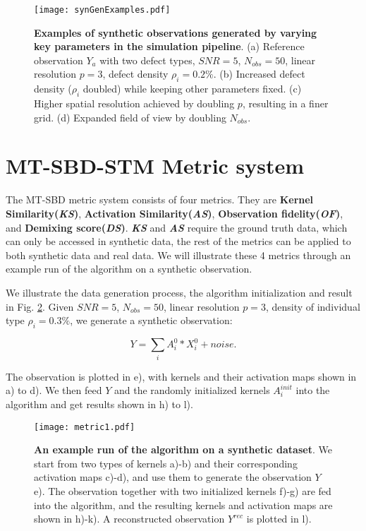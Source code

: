 \begin{figure}
	\texttt{[image: synGenExamples.pdf]} 
	\centering
	\caption[\textbf{Examples of synthetic observations generated by varying key parameters in the simulation pipeline}]{\textbf{Examples of synthetic observations generated by varying key parameters in the simulation pipeline}. (a) Reference observation $Y_a$ with two defect types, $SNR = 5$, $N_{obs}=50$, linear resolution $p=3$, defect density $\rho_i=0.2\%$. (b) Increased defect density ($\rho_i$ doubled) while keeping other parameters fixed. (c) Higher spatial resolution achieved by doubling $p$, resulting in a finer grid. (d) Expanded field of view by doubling $N_{obs}$.}
	\label{fig:synexample}
\end{figure}

\section{MT-SBD-STM Metric system}
The MT-SBD metric system consists of four metrics. They are \textbf{Kernel Similarity(\textit{KS})}, \textbf{Activation Similarity(\textit{AS})}, \textbf{Observation fidelity(\textit{OF})}, and \textbf{Demixing score(\textit{DS})}. \textbf{\textit{KS}} and \textbf{\textit{AS}} require the ground truth data, which can only be accessed in synthetic data, the rest of the metrics can be applied to both synthetic data and real data. We will illustrate these 4 metrics through an example run of the algorithm on a synthetic observation. 

We illustrate the data generation process, the algorithm initialization and result in Fig. \ref{fig:metric}. Given $SNR = 5$, $N_{obs}=50$, linear resolution $p = 3$, density of individual type $\rho_i = 0.3\%$, we generate a synthetic observation: 

\begin{equation}
	\label{eq:observation}
	Y = \sum_i A^0_i * X^0_i + noise.
\end{equation} 

The observation is plotted in e), with kernels and their activation maps shown in a) to d). We then feed $Y$ and the randomly initialized kernels $A_i^{init}$ into the algorithm and get results shown in h) to l). 

\begin{figure}
	\texttt{[image: metric1.pdf]} 
	\centering
	\caption[\textbf{An example run of the algorithm on a synthetic dataset}]{\textbf{An example run of the algorithm on a synthetic dataset}. We start from two types of kernels a)-b) and their corresponding activation maps c)-d), and use them to generate the observation $Y$ e). The observation together with two initialized kernels f)-g) are fed into the algorithm, and the resulting kernels and activation maps are shown in h)-k). A reconstructed observation $Y^{rec}$ is plotted in l).}
	\label{fig:metric}
\end{figure}

